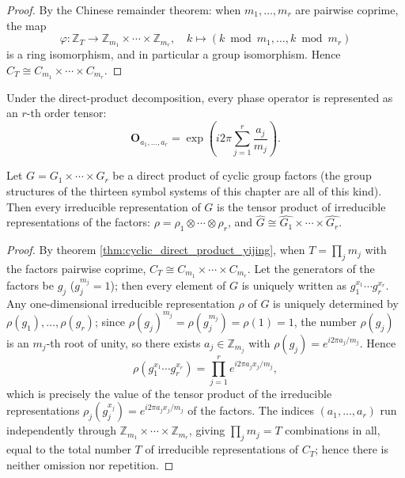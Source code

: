 \begin{proof}
By the Chinese remainder theorem: when $m_1, \dots, m_r$ are pairwise coprime, the map
\[
\varphi: \mathbb{Z}_T \to \mathbb{Z}_{m_1} \times \cdots \times \mathbb{Z}_{m_r}, \quad k \mapsto (k \bmod m_1, \dots, k \bmod m_r)
\]
is a ring isomorphism, and in particular a group isomorphism. Hence $C_T \cong C_{m_1} \times \cdots \times C_{m_r}$.
\end{proof}

\begin{definition}\label{def:tensor_representation_yijing}
Under the direct-product decomposition, every phase operator is represented as an $r$-th order tensor:
\[
\mathbf{O}_{a_1,\dots,a_r} = \exp\left(i2\pi \sum_{j=1}^r \frac{a_j}{m_j}\right).
\]
\end{definition}

\begin{proposition}\label{prop:irrep_tensor_product_yijing}
Let $G = G_1 \times \cdots \times G_r$ be a direct product of cyclic group factors (the group structures of the thirteen symbol systems of this chapter are all of this kind). Then every irreducible representation of $G$ is the tensor product of irreducible representations of the factors: $\rho = \rho_1 \otimes \cdots \otimes \rho_r$, and $\widehat{G} \cong \widehat{G_1} \times \cdots \times \widehat{G_r}$.
\end{proposition}

\begin{proof}
By theorem \ref{thm:cyclic_direct_product_yijing}, when $T = \prod_j m_j$ with the factors pairwise coprime, $C_T \cong C_{m_1} \times \cdots \times C_{m_r}$. Let the generators of the factors be $g_j$ ($g_j^{m_j} = 1$); then every element of $G$ is uniquely written as $g_1^{x_1} \cdots g_r^{x_r}$. Any one-dimensional irreducible representation $\rho$ of $G$ is uniquely determined by $\rho(g_1),\dots,\rho(g_r)$; since $\rho(g_j)^{m_j} = \rho(g_j^{m_j}) = \rho(1) = 1$, the number $\rho(g_j)$ is an $m_j$-th root of unity, so there exists $a_j \in \mathbb{Z}_{m_j}$ with $\rho(g_j) = e^{i2\pi a_j/m_j}$. Hence
\[
\rho(g_1^{x_1}\cdots g_r^{x_r}) = \prod_{j=1}^r e^{i2\pi a_j x_j / m_j},
\]
which is precisely the value of the tensor product of the irreducible representations $\rho_j(g_j^{x_j}) = e^{i2\pi a_j x_j/m_j}$ of the factors. The indices $(a_1,\dots,a_r)$ run independently through $\mathbb{Z}_{m_1}\times\cdots\times\mathbb{Z}_{m_r}$, giving $\prod_j m_j = T$ combinations in all, equal to the total number $T$ of irreducible representations of $C_T$; hence there is neither omission nor repetition.
\end{proof}


